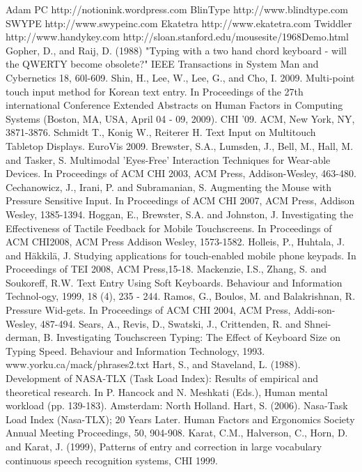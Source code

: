\documentclass{chi2011}
\begin{document}












\begin{thebibliography}{1}
 Adam PC http://notionink.wordpress.com
 BlinType http://www.blindtype.com
 SWYPE http://www.swypeinc.com
 Ekatetra http://www.ekatetra.com
 Twiddler http://www.handykey.com
 http://sloan.stanford.edu/mousesite/1968Demo.html
 Gopher, D., and Raij, D. (1988) "Typing with a two hand chord keyboard - will the QWERTY become obsolete?" IEEE Transactions in System Man and Cybernetics 18, 60l-609. 
 Shin, H., Lee, W., Lee, G., and Cho, I. 2009. Multi-point touch input method for Korean text entry. In Proceedings of the 27th international Conference Extended Abstracts on Human Factors in Computing Systems (Boston, MA, USA, April 04 - 09, 2009). CHI '09. ACM, New York, NY, 3871-3876.
 Schmidt T., Konig W., Reiterer H. Text Input on Multitouch Tabletop Displays. EuroVis 2009.
 Brewster, S.A., Lumsden, J., Bell, M., Hall, M. and Tasker, S. Multimodal 'Eyes-Free' Interaction Techniques for Wear-able Devices. In Proceedings of ACM CHI 2003, ACM Press, Addison-Wesley, 463-480.
 Cechanowicz, J., Irani, P. and Subramanian, S. Augmenting the Mouse with Pressure Sensitive Input. In Proceedings of ACM CHI 2007, ACM Press, Addison Wesley, 1385-1394.
 Hoggan, E., Brewster, S.A. and Johnston, J. Investigating the Effectiveness of Tactile Feedback for Mobile Touchscreens. In Proceedings of ACM CHI2008, ACM Press Addison Wesley, 1573-1582.
 Holleis, P., Huhtala, J. and Häkkilä, J. Studying applications for touch-enabled mobile phone keypads. In Proceedings of TEI 2008, ACM Press,15-18.
 Mackenzie, I.S., Zhang, S. and Soukoreff, R.W. Text Entry Using Soft Keyboards. Behaviour and Information Technol-ogy, 1999, 18 (4), 235 - 244.
 Ramos, G., Boulos, M. and Balakrishnan, R. Pressure Wid-gets. In Proceedings of ACM CHI 2004, ACM Press, Addi-son-Wesley, 487-494.
 Sears, A., Revis, D., Swatski, J., Crittenden, R. and Shnei-derman, B. Investigating Touchscreen Typing: The Effect of Keyboard Size on Typing Speed. Behaviour and Information Technology, 1993.
 www.yorku.ca/mack/phrases2.txt
 Hart, S., and Staveland, L. (1988). Development of NASA-TLX (Task Load Index): Results of empirical and theoretical research. In P. Hancock and N. Meshkati (Eds.), Human mental workload (pp. 139-183). Amsterdam: North Holland.
 Hart, S. (2006). Nasa-Task Load Index (Nasa-TLX); 20 Years Later. Human Factors and Ergonomics Society Annual Meeting Proceedings, 50, 904-908.
 Karat, C.M., Halverson, C., Horn, D. and Karat, J. (1999), Patterns of entry and correction in large vocabulary continuous speech recognition systems, CHI 1999.

\end{thebibliography}
\end{document}
